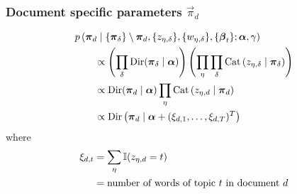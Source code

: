 \subsubsection{Document specific parameters $\vec \pi_d$}
\begin{align}
    \hspace{2em}&\hspace{-2em}
    p\left(\vec \pi_d \given \{\vec \pi_\delta\} \setminus \vec \pi_d, \{z_{\eta, \delta}\}, \{w_{\eta, \delta}\}, \{\vec \beta_t\}; \vec \alpha, \gamma\right) \nonumber\\
    &\propto \left(\prod_\delta \Dir(\vec \pi_\delta \given \vec \alpha)\right)\left(\prod_\eta \prod_\delta \Cat\left(z_{\eta, \delta} \given \vec \pi_\delta\right)\right) \nonumber\\
    &\propto \Dir(\vec \pi_d \given \vec \alpha) \prod_\eta \Cat\left(z_{\eta, d} \given \vec \pi_d\right) \nonumber\\
    &\propto \Dir\left(\vec \pi_d \given \vec \alpha + (\xi_{d, 1}, \dotsc, \xi_{d, T})^T\right)
\end{align}
where
\begin{align}
    \xi_{d, t}       &= \sum_\eta \operatorname{\mathbb I}(z_{\eta, d} = t) \label{eqn:models/lda/gibbs/xi} \\
                    &= \text{number of words of topic $t$ in document $d$} \nonumber
\end{align}


